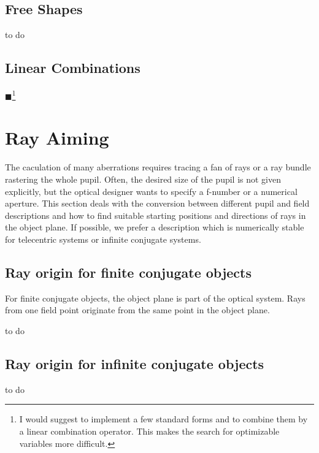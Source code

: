 \documentclass[12pt,a4paper,twoside,openright,BCOR10mm,headsepline,titlepage,abstracton,chapterprefix,final]{scrreprt}
\newcommand{\remark}[1]{{\color{red}$\blacksquare$}\footnote{{\color{red}#1}}}
\begin{document}
\subsection{Free Shapes}
to do

\subsection{Linear Combinations}
\remark{I would suggest to implement a few standard forms and to combine them by a linear combination operator. This makes the search for optimizable
variables more difficult.}




\section{Ray Aiming}
The caculation of many aberrations requires tracing a fan of rays or a ray bundle rastering the whole pupil.
Often, the desired size of the pupil is not given explicitly, but the optical designer wants to specify a f-number or a numerical aperture.
This section deals with the conversion between different pupil and field descriptions and how to find suitable starting positions and directions of rays in the object plane.
If possible, we prefer a description which is numerically stable for telecentric systems or infinite conjugate systems.

\subsection{Ray origin for finite conjugate objects}
For finite conjugate objects, the object plane is part of the optical system. Rays from one field point originate from the same point in the object plane.

to do

\subsection{Ray origin for infinite conjugate objects}
to do
\end{document}
